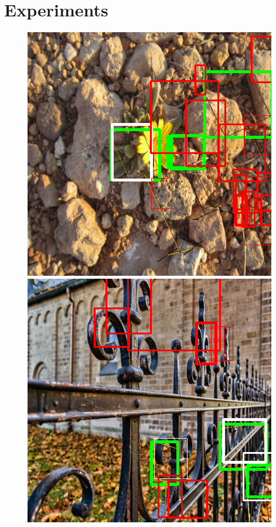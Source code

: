 \documentclass{article}
\begin{document}
\section{Experiments}
\begin{figure}[h]
	\centering
	\begin{minipage}{0.3\textwidth}
		\centering
		\includegraphics[width=\textwidth]{../fig/result1}
	\end{minipage}
	\begin{minipage}{0.3\textwidth}
		\centering
		\includegraphics[width=\textwidth]{../fig/result2}
	\end{minipage}


\end{figure}
\end{document}
